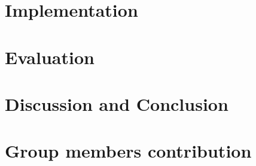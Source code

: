 \documentclass[11pt]{report}
\begin{document}
\section*{Implementation}

\section*{Evaluation}

\section*{Discussion and Conclusion}

\section*{Group members contribution}

\newpage
\printbibliography
{}
\end{document}
